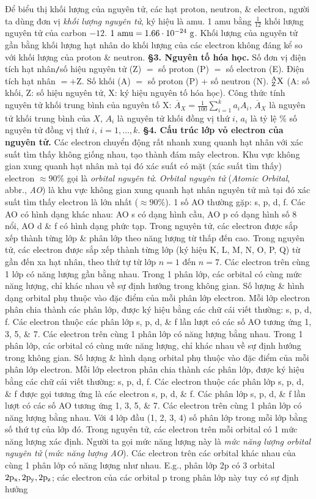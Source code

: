 \documentclass{article}
\numberwithin{equation}{section}
\begin{document}
Để biểu thị khối lượng của nguyên tử, các hạt proton, neutron, \& electron, người ta dùng đơn vị \textit{khối lượng nguyên tử}, ký hiệu là amu. 1 amu bằng $\frac{1}{12}$ khối lượng nguyên tử của carbon $-12$. $\rm 1\ amu = 1.66\cdot 10^{-24}\ g$. Khối lượng của nguyên tử gần bằng khối lượng hạt nhân do khối lượng của các electron không đáng kể so với khối lượng của proton \& neutron. \textbf{\S3. Nguyên tố hóa học.} Số đơn vị điện tích hạt nhân\texttt{/}số hiệu nguyên tử (Z) $=$ số proton (P) $=$ số electron (E). Điện tích hạt nhân $= +$Z. Số khối (A) $=$ số proton (P) + số neutron (N). $\rm{}_Z^AX$ (A: số khối, Z: số hiệu nguyên tử, X: ký hiệu nguyên tố hóa học). Công thức tính nguyên tử khối trung bình của nguyên tố X: $\overline{A}_X = \frac{1}{100}\sum_{i=1}^k a_iA_i$, $\overline{A}_X$ là nguyên tử khối trung bình của $X$, $A_i$ là nguyên tử khối đồng vị thứ $i$, $a_i$ là tỷ lệ \% số nguyên tử đồng vị thứ $i$, $i = 1,\ldots,k$. \textbf{\S4. Cấu trúc lớp vỏ electron của nguyên tử.} Các electron chuyển động rất nhanh xung quanh hạt nhân với xác suất tìm thấy không giống nhau, tạo thành đám mây electron. Khu vực không gian xung quanh hạt nhân mà tại đó xác suất có mặt (xác suất tìm thấy) electron $\approx90\%$ gọi là \textit{orbital nguyên tử}. \emph{Orbital nguyên tử} (\emph{Atomic Orbital}, abbr., \emph{AO}) là khu vực không gian xung quanh hạt nhân nguyên tử mà tại đó xác suất tìm thấy electron là lớn nhất ($\approx90\%$). 1 số AO thường gặp: s, p, d, f. Các AO có hình dạng khác nhau: AO s có dạng hình cầu, AO p có dạng hình số 8 nổi, AO d \& f có hình dạng phức tạp. Trong nguyên tử, các electron được sắp xếp thành từng lớp \& phân lớp theo năng lượng từ thấp đến cao. Trong nguyên tử, các electron được sắp xếp thành từng lớp (ký hiệu K, L, M, N, O, P, Q) từ gần đến xa hạt nhân, theo thứ tự từ lớp $n = 1$ đến $n = 7$. Các electron trên cùng 1 lớp có năng lượng gần bằng nhau. Trong 1 phân lớp, các orbital có cùng mức năng lượng, chỉ khác nhau về sự định hướng trong không gian. Số lượng \& hình dạng orbital phụ thuộc vào đặc điểm của mỗi phân lớp electron. Mỗi lớp electron phân chia thành các phân lớp, được ký hiệu bằng các chữ cái viết thường: s, p, d, f. Các electron thuộc các phân lớp s, p, d, \& f lần lượt có các số AO tương ứng 1, 3, 5, \& 7. Các electron trên cùng 1 phân lớp có năng lượng bằng nhau. Trong 1 phân lớp, các orbital có cùng mức năng lượng, chỉ khác nhau về sự định hướng trong không gian. Số lượng \& hình dạng orbital phụ thuộc vào đặc điểm của mỗi phân lớp electron. Mỗi lớp electron phân chia thành các phân lớp, được ký hiệu bằng các chữ cái viết thường: s, p, d, f. Các electron thuộc các phân lớp s, p, d, \& f được gọi tương ứng là các electron s, p, d, \& f. Các phân lớp s, p, d, \& f lần lượt có các số AO tương ứng 1, 3, 5, \& 7. Các electron trên cùng 1 phân lớp có năng lượng bằng nhau. Với 4 lớp đầu (1, 2, 3, 4) số phân lớp trong mỗi lớp bằng số thứ tự của lớp đó. Trong nguyên tử, các electron trên mỗi orbital có 1 mức năng lượng xác định. Người ta gọi mức năng lượng này là \textit{mức năng lượng orbital nguyên tử} (\textit{mức năng lượng AO}). Các electron trên các orbital khác nhau của cùng 1 phân lớp có năng lượng như nhau. E.g., phân lớp 2p có 3 orbital $\rm 2p_x,2p_y,2p_z$; các electron của các orbital p trong phân lớp này tuy có sự định hướng 
\end{document}
